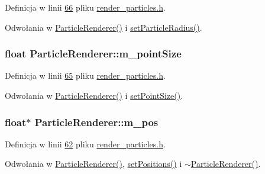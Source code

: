Definicja w linii \hyperlink{render__particles_8h_source_l00066}{66} pliku \hyperlink{render__particles_8h_source}{render\-\_\-particles.\-h}.



Odwołania w \hyperlink{render__particles_8cpp_source_l00025}{Particle\-Renderer()} i \hyperlink{render__particles_8h_source_l00042}{set\-Particle\-Radius()}.

\hypertarget{class_particle_renderer_a1ca13e546c937cb546c0da19fa853b34}{
\subsubsection[{m\-\_\-point\-Size}]{\setlength{\rightskip}{0pt plus 5cm}float Particle\-Renderer\-::m\-\_\-point\-Size\hspace{0.3cm}{\ttfamily [protected]}}}\label{class_particle_renderer_a1ca13e546c937cb546c0da19fa853b34}


Definicja w linii \hyperlink{render__particles_8h_source_l00065}{65} pliku \hyperlink{render__particles_8h_source}{render\-\_\-particles.\-h}.



Odwołania w \hyperlink{render__particles_8cpp_source_l00025}{Particle\-Renderer()} i \hyperlink{render__particles_8h_source_l00038}{set\-Point\-Size()}.

\hypertarget{class_particle_renderer_a1d74720edb5c3a13edcdd176ac0d84c7}{
\subsubsection[{m\-\_\-pos}]{\setlength{\rightskip}{0pt plus 5cm}float$\ast$ Particle\-Renderer\-::m\-\_\-pos\hspace{0.3cm}{\ttfamily [protected]}}}\label{class_particle_renderer_a1d74720edb5c3a13edcdd176ac0d84c7}


Definicja w linii \hyperlink{render__particles_8h_source_l00062}{62} pliku \hyperlink{render__particles_8h_source}{render\-\_\-particles.\-h}.



Odwołania w \hyperlink{render__particles_8cpp_source_l00025}{Particle\-Renderer()}, \hyperlink{render__particles_8cpp_source_l00042}{set\-Positions()} i \hyperlink{render__particles_8cpp_source_l00037}{$\sim$\-Particle\-Renderer()}.

